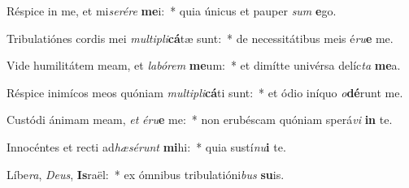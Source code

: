 \item Réspice in me, et mi\textit{se}\textit{ré}\textit{re} \textbf{me}i:~* quia únicus et pauper \textit{sum} \textbf{e}go.
\item Tribulatiónes cordis mei \textit{mul}\textit{ti}\textit{pli}\textbf{cá}tæ sunt:~* de necessitátibus meis é\textit{ru}\textbf{e} me.
\item Vide humilitátem meam, et \textit{la}\textit{bó}\textit{rem} \textbf{me}um:~* et dimítte univérsa delíc\textit{ta} \textbf{me}a.
\item Réspice inimícos meos quóniam \textit{mul}\textit{ti}\textit{pli}\textbf{cá}ti sunt:~* et ódio iníquo \textit{o}\textbf{dé}runt me.
\item Custódi ánimam meam, \textit{et} \textit{é}\textit{ru}\textbf{e} me:~* non erubéscam quóniam sperá\textit{vi} \textbf{in} te.
\item Innocéntes et recti ad\textit{hæ}\textit{sé}\textit{runt} \textbf{mi}hi:~* quia sustí\textit{nu}\textbf{i} te.
\item Líbe\textit{ra}, \textit{De}\textit{us}, \textbf{Is}raël:~* ex ómnibus tribulatióni\textit{bus} \textbf{su}is.
